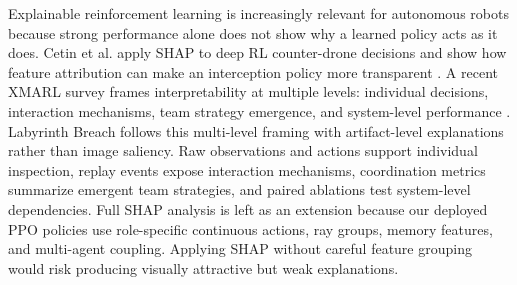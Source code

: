 \documentclass[journal]{IEEEtran}
\begin{document}
Explainable reinforcement learning is increasingly relevant for autonomous robots because strong performance alone does not show why a learned policy acts as it does. Cetin et al. apply SHAP to deep RL counter-drone decisions and show how feature attribution can make an interception policy more transparent \cite{cetin2024shap}. A recent XMARL survey frames interpretability at multiple levels: individual decisions, interaction mechanisms, team strategy emergence, and system-level performance \cite{sheng2026xai}. Labyrinth Breach follows this multi-level framing with artifact-level explanations rather than image saliency. Raw observations and actions support individual inspection, replay events expose interaction mechanisms, coordination metrics summarize emergent team strategies, and paired ablations test system-level dependencies. Full SHAP analysis is left as an extension because our deployed PPO policies use role-specific continuous actions, ray groups, memory features, and multi-agent coupling. Applying SHAP without careful feature grouping would risk producing visually attractive but weak explanations.
\end{document}
